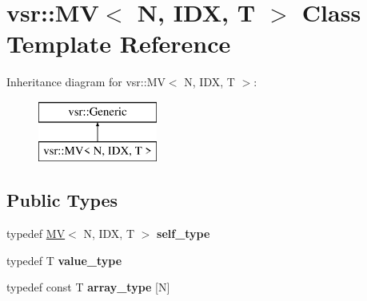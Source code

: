 \hypertarget{classvsr_1_1_m_v}{\section{vsr\-:\-:M\-V$<$ N, I\-D\-X, T $>$ Class Template Reference}
\label{classvsr_1_1_m_v}
}
Inheritance diagram for vsr\-:\-:M\-V$<$ N, I\-D\-X, T $>$\-:\begin{figure}[H]
\begin{center}
\leavevmode
\includegraphics[height=2.000000cm]{classvsr_1_1_m_v}
\end{center}
\end{figure}
\subsection*{Public Types}
\begin{DoxyCompactItemize}
\item 
\hypertarget{classvsr_1_1_m_v_a4b57b189540374091655ef5ebbcbac00}{typedef \hyperlink{classvsr_1_1_m_v}{M\-V}$<$ N, I\-D\-X, T $>$ {\bfseries self\-\_\-type}}\label{classvsr_1_1_m_v_a4b57b189540374091655ef5ebbcbac00}

\item 
\hypertarget{classvsr_1_1_m_v_aaea75c753a56bb855149d8367b58065e}{typedef T {\bfseries value\-\_\-type}}\label{classvsr_1_1_m_v_aaea75c753a56bb855149d8367b58065e}

\item 
\hypertarget{classvsr_1_1_m_v_a79eca9cffee4d1552b2384219c2fb584}{typedef const T {\bfseries array\-\_\-type} \mbox{[}N\mbox{]}}\label{classvsr_1_1_m_v_a79eca9cffee4d1552b2384219c2fb584}

\end{DoxyCompactItemize}
